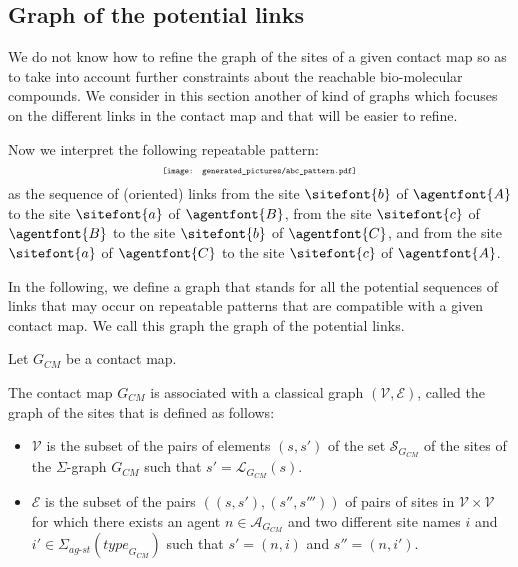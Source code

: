 \documentclass{entcs}
\newcommand{\graphsymb}{G}
\newcommand{\linksite}{\signaturesymb_{\textit{ag-st}}}
\newcommand{\signaturesymb}{\Sigma}
\newcommand{\agents}[1][\graphsymb]{\mathcal{A}_{#1}}
\newcommand{\type}[1][\graphsymb]{\textit{type}_{#1}}
\newcommand{\sites}[1][\graphsymb]{\mathcal{S}_{#1}}
\newcommand{\links}[1][\graphsymb]{\mathcal{L}_{#1}}
\begin{document}
\subsection{Graph of the potential links}

We do not know how to refine the graph of the sites of a given contact map so as to take into account further constraints about the reachable bio-molecular compounds. We consider in this section another of kind of graphs which focuses on the different links in the contact map and that will be easier to refine.

Now we interpret the following repeatable pattern:
\begin{equation*}
\scalebox{0.6}{\texttt{[image: generated\_pictures/abc\_pattern.pdf]}}
\end{equation*}
as the sequence of (oriented) links from the
site $\sitefont{b}$ of $\agentfont{A}$ to the site
 $\sitefont{a}$ of $\agentfont{B}$,
 from the site $\sitefont{c}$ of $\agentfont{B}$ to the site $\sitefont{b}$ of $\agentfont{C}$,
 and from the site $\sitefont{a}$ of $\agentfont{C}$ to the site $\sitefont{c}$ of $\agentfont{A}$.

In the following, we define a graph that stands for all the potential sequences of links that may occur on repeatable patterns that are compatible with a given contact map. We call this graph the graph of the potential links.

\begin{defn}
  Let $\graphsymb_{\textit{CM}}$ be a contact map.

  The contact map $\graphsymb_{\textit{CM}}$ is associated with a classical graph $(\mathcal{V},\mathcal{E})$, called the graph of the sites that is defined as follows:
  \begin{itemize}
    \item $\mathcal{V}$ is the subset of the pairs of elements $(s,s')$ of the set  $\sites[\graphsymb_{\textit{CM}}]$ of the sites of the $\Sigma$-graph $\graphsymb_{\textit{CM}}$ such that $s'=\links[\graphsymb_{\textit{CM}}](s)$.
    \item $\mathcal{E}$ is the subset of the pairs $((s,s'),(s'',s'''))$ of pairs of sites in $\mathcal{V}\times\mathcal{V}$ for which  there exists an agent $n\in\agents[\graphsymb_{\textit{CM}}]$ and two different site names $i$ and $i' \in\linksite(\type[\graphsymb_{\textit{CM}}])$ such that $s'=(n,i)$ and $s''=(n,i')$.
  \end{itemize}
  \end{defn}
\end{document}
